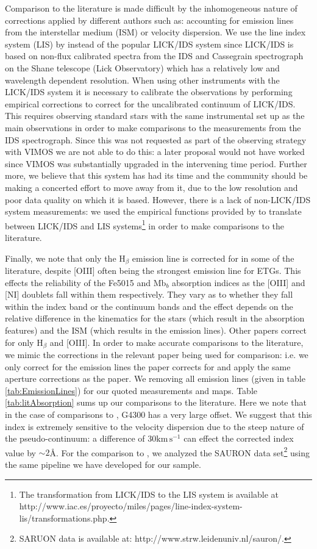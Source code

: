 	Comparison to the literature is made difficult by the inhomogeneous nature of corrections applied by different authors such as: accounting for emission lines from the interstellar medium (ISM) or velocity dispersion. We use the line index system (LIS) by \citet{Vazdekis2010} instead of the popular LICK/IDS system \citep{Faber1985, Worthey1994} since LICK/IDS is based on non-flux calibrated spectra from the IDS and Cassegrain spectrograph on the Shane telescope (Lick Observatory) which has a relatively low and wavelength dependent resolution. When using other instruments with the LICK/IDS system it is necessary to calibrate the observations by performing empirical corrections to correct for the uncalibrated continuum of LICK/IDS. This requires observing standard stars with the same instrumental set up as the main observations in order to make comparisons to the measurements from the IDS spectrograph. Since this was not requested as part of the observing strategy with VIMOS we are not able to do this: a later proposal would not have worked since VIMOS was substantially upgraded in the intervening time period. Further more, we believe that this system has had its time and the community should be making a concerted effort to move away from it, due to the low resolution and poor data quality on which it is based. However, there is a lack of non-LICK/IDS system measurements: we used the empirical functions provided by \citet{Vazdekis2010} to translate between LICK/IDS and LIS systems\footnote{The transformation from LICK/IDS to the LIS system is available at http://www.iac.es/proyecto/miles/pages/line-index-system-lis/transformations.php.} in order to make comparisons to the literature. 


	Finally, we note that only the H$_\beta$ emission line is corrected for in some of the literature, despite [OIII] often being the strongest emission line for ETGs. This effects the reliability of the Fe5015 and Mb$_b$ absorption indices as the [OIII] and [NI] doublets fall within them respectively. They vary as to whether they fall within the index band or the continuum bands and the effect depends on the relative difference in the kinematics for the stars (which result in the absorption features) and the ISM (which results in the emission lines). Other papers correct for only H$_\beta$ and [OIII]. In order to make accurate comparisons to the literature, we mimic the corrections in the relevant paper being used for comparison: i.e. we only correct for the emission lines the paper corrects for and apply the same aperture corrections as the paper. We removing all emission lines (given in table \ref{tab:EmissionLines}) for our quoted measurements and maps. Table \ref{tab:litAbsorption} sums up our comparisons to the literature. Here we note that in the case of comparisons to \citet{Rampazzo2005}, G4300 has a very large offset. We suggest that this index is extremely sensitive to the velocity dispersion due to the steep nature of the pseudo-continuum: a difference of $30 \mathrm{km \, s^{-1}}$ can effect the corrected index value by $\sim 2$\AA. For the comparison to \citet{Vazdekis2010}, we analyzed the SAURON data set\footnote{SARUON data is available at: http://www.strw.leidenuniv.nl/sauron/.} \citep{Emsellem2004} using the same pipeline we have developed for our sample. 

